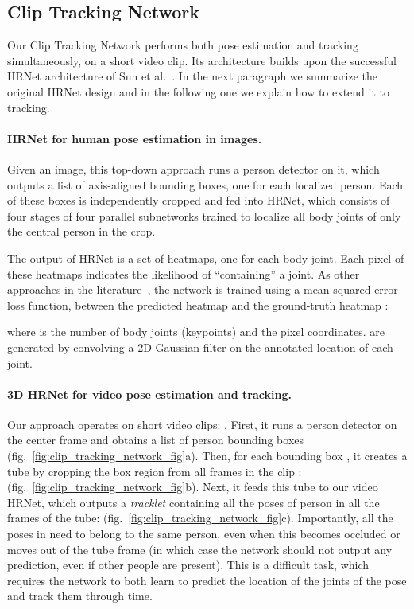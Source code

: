 \documentclass[10pt,twocolumn,letterpaper]{article}
\begin{document}
\subsection{Clip Tracking Network}\label{sec:3DHRnet}
Our Clip Tracking Network performs both pose estimation and tracking simultaneously, on a short video clip. Its architecture builds upon the successful HRNet architecture of Sun et al.~\cite{sun2019deep}. In the next paragraph we summarize the original HRNet design and in the following one we explain how to extend it to tracking.

\paragraph{HRNet for human pose estimation in images.} Given an image, this top-down approach runs a person detector on it, which outputs a list of axis-aligned bounding boxes, one for each localized person. Each of these boxes is independently cropped and fed into HRNet, which consists of four stages of four parallel subnetworks trained to localize all body joints of only the central person in the crop.

The output of HRNet is a set of heatmaps, one for each body joint. Each pixel of these heatmaps indicates the likelihood of ``containing'' a joint. 
As other approaches in the literature~\cite{cao2018openpose, insafutdinov16eccv, newell2017associative, pishchulin16cvpr,chen2018cascaded, he2017mask}, the network is trained using a mean squared error loss function, between the predicted heatmap   and the ground-truth heatmap  :

where  is the number of body joints (keypoints) and  the pixel coordinates.   are generated by convolving a 2D Gaussian filter on the annotated location of each joint. 

\paragraph{3D HRNet for video pose estimation and tracking.} Our approach operates on short video clips: {\small }. 
First, it runs a person detector on the center frame  and obtains a list of person bounding boxes {\small } (fig.~\ref{fig:clip_tracking_network_fig}{\color{red}a}).
Then, for each bounding box {\small }, it creates a tube {\small }  by cropping the box region from all frames in the clip {\small : } (fig.~\ref{fig:clip_tracking_network_fig}{\color{red}b}). Next, it feeds this tube to our video HRNet, which outputs a {\it tracklet} containing all the poses of person  in all the frames of the tube: {\small } (fig.~\ref{fig:clip_tracking_network_fig}{\color{red}c}).
Importantly, all the poses in  need to belong to the same person, even when this becomes occluded or moves out of the tube frame (in which case the network should not output any prediction, even if other people are present). This is a difficult task, which requires the network to both learn to predict the location of the joints of the pose and track them through time. 
\end{document}
